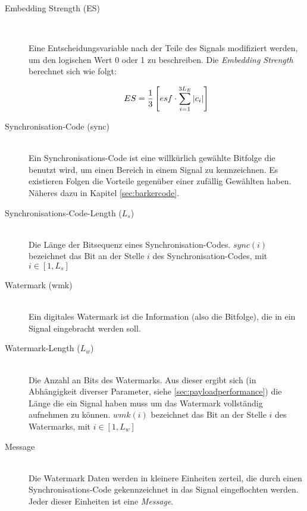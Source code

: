 \begin{description}
\item[Embedding Strength (ES)] \hfill \\ 

Eine Entscheidungsvariable nach der Teile des Signals modifiziert werden, um den logischen Wert 0 oder 1 zu beschreiben. Die \textit{Embedding Strength} berechnet sich wie folgt:

	\begin{equation}
		ES = {1 \over 3} \left[ esf \cdot \sum\limits_{i=1}^{3{L}_{E}}|c_i| \right] \label{equ:embeddingstrength}
	\end{equation}
		
\item[Synchronisation-Code (sync)] \hfill \\ 
Ein Synchronisations-Code ist eine willk\"urlich gew\"ahlte Bitfolge die benutzt wird, um einen Bereich in einem Signal zu kennzeichnen. Es existieren Folgen die Vorteile gegen\"uber einer zuf\"allig Gew\"ahlten haben. N\"aheres dazu in Kapitel \ref{sec:barkercode}.

\item[Synchronisations-Code-Length (${L}_{s}$)] \hfill \\ 
Die L\"ange der Bitsequenz eines Synchronisation-Codes. $sync(i)$ bezeichnet das Bit an der Stelle $i$ des Synchronisation-Codes, mit $i\in[1,{L}_{s}]$
	
\item[Watermark (wmk)] \hfill \\ 
Ein digitales Watermark ist die Information (also die Bitfolge), die in ein Signal eingebracht werden soll. 

\item[Watermark-Length (${L}_{w}$)] \hfill \\ 
Die Anzahl an Bits des Watermarks. Aus dieser ergibt sich (in Abh\"angigkeit diverser Parameter, siehe \ref{sec:payloadperformance}) die L\"ange die ein Signal haben muss um das Watermark vollst\"andig aufnehmen zu k\"onnen. $wmk(i)$ bezeichnet das Bit an der Stelle $i$ des Watermarks, mit $i\in[1,{L}_{w}]$

\item[Message] \hfill \\ 
Die Watermark Daten werden in kleinere Einheiten zerteil, die durch einen Synchronisations-Code gekennzeichnet in das Signal eingeflochten werden. Jeder dieser Einheiten ist eine \textit{Message}. 
	

\end{description}
